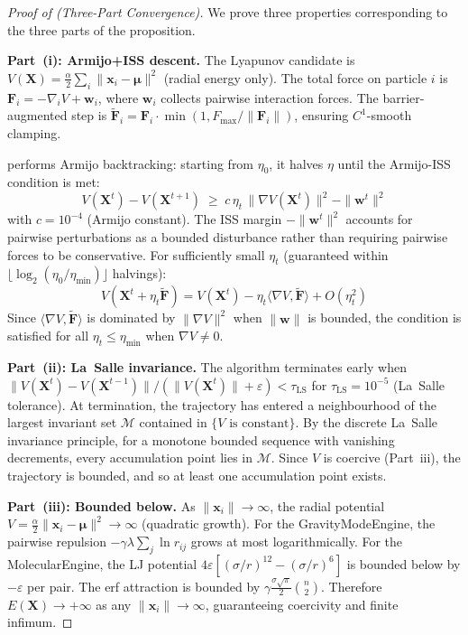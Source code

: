 \documentclass{article}
\begin{document}
\begin{proof}[Proof of  (Three-Part Convergence)]
We prove three properties corresponding to the three parts of the proposition.

\textbf{Part~(i): Armijo+ISS descent.}
The Lyapunov candidate is $V(\mathbf{X}) = \frac{\alpha}{2}\sum_i \|\mathbf{x}_i - \bm{\mu}\|^2$ (radial energy only). The total force on particle $i$ is $\mathbf{F}_i = -\nabla_i V + \mathbf{w}_i$, where $\mathbf{w}_i$ collects pairwise interaction forces. The barrier-augmented step is $\tilde{\mathbf{F}}_i = \mathbf{F}_i \cdot \min(1, F_{\max}/\|\mathbf{F}_i\|)$, ensuring $C^1$-smooth clamping.

 performs Armijo backtracking: starting from $\eta_0$, it halves $\eta$ until the Armijo-ISS condition is met:
\begin{equation}
V(\mathbf{X}^t) - V(\mathbf{X}^{t+1}) \;\geq\; c\,\eta_t\,\|\nabla V(\mathbf{X}^t)\|^2 - \|\mathbf{w}^t\|^2
\end{equation}
with $c = 10^{-4}$ (Armijo constant). The ISS margin $-\|\mathbf{w}^t\|^2$ accounts for pairwise perturbations as a bounded disturbance rather than requiring pairwise forces to be conservative. For sufficiently small $\eta_t$ (guaranteed within $\lfloor\log_2(\eta_0/\eta_{\min})\rfloor$ halvings):
\begin{equation}
V(\mathbf{X}^t + \eta_t \tilde{\mathbf{F}}) = V(\mathbf{X}^t) - \eta_t \langle \nabla V, \tilde{\mathbf{F}}\rangle + O(\eta_t^2)
\end{equation}
Since $\langle \nabla V, \tilde{\mathbf{F}}\rangle$ is dominated by $\|\nabla V\|^2$ when $\|\mathbf{w}\|$ is bounded, the condition is satisfied for all $\eta_t \leq \eta_{\min}$ when $\nabla V \neq 0$.

\textbf{Part~(ii): La~Salle invariance.}
The algorithm terminates early when $\|V(\mathbf{X}^{t}) - V(\mathbf{X}^{t-1})\|/(\|V(\mathbf{X}^{t})\| + \varepsilon) < \tau_{\text{LS}}$ for $\tau_{\text{LS}} = 10^{-5}$ (La~Salle tolerance). At termination, the trajectory has entered a neighbourhood of the largest invariant set $\mathcal{M}$ contained in $\{V \text{ is constant}\}$. By the discrete La~Salle invariance principle, for a monotone bounded sequence with vanishing decrements, every accumulation point lies in $\mathcal{M}$. Since $V$ is coercive (Part~iii), the trajectory is bounded, and so at least one accumulation point exists.

\textbf{Part~(iii): Bounded below.}
As $\|\mathbf{x}_i\| \to \infty$, the radial potential $V = \frac{\alpha}{2}\|\mathbf{x}_i - \bm{\mu}\|^2 \to \infty$ (quadratic growth). For the GravityModeEngine, the pairwise repulsion $-\gamma\lambda\sum_j \ln r_{ij}$ grows at most logarithmically. For the MolecularEngine, the LJ potential $4\varepsilon[(\sigma/r)^{12} - (\sigma/r)^6]$ is bounded below by $-\varepsilon$ per pair. The erf attraction is bounded by $\gamma\frac{\sigma\sqrt{\pi}}{2}\binom{n}{2}$. Therefore $E(\mathbf{X}) \to +\infty$ as any $\|\mathbf{x}_i\| \to \infty$, guaranteeing coercivity and finite infimum.


\end{proof}
\end{document}
